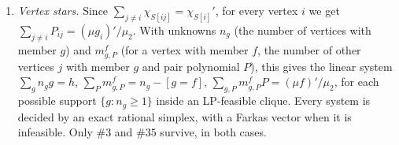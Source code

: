 \documentclass[11pt]{article}
\theoremstyle{definition}
\begin{document}
\begin{enumerate}
$(S^k)_{ij}\equiv k\pmod2$, by $S^k\equiv I+kJ$; (J2) $\mathrm{Sim}\mid g_ig_j-\psi_{ij}^2$; (J3)
$\psi_{ij}(\lambda)^2\le g_i(\lambda)g_j(\lambda)$ at the multiple eigenvalues (Cauchy--Schwarz for
$E_\lambda\succeq0$); (J4) $\chi_{S[ij]}$ is real-rooted and interlaces $\chi_{S[i]}$ and
$\chi_{S[j]}$; (J5) $\chi_{S[ij]}$ has the trace, the trace of the square and the $2$-adic form
\cite[Thm.~2.5]{GSY21} of a Seidel matrix of order $n-2$. Every $\psi_{ij}$ allowed by (J1)--(J5) is
enumerated. The graph ``some pair polynomial exists'' and its cliques exclude $\#20$.
\item \emph{Vertex stars.} Since $\sum_{j\ne i}\chi_{S[ij]}=\chi_{S[i]}'$, for every vertex $i$ we get
$\sum_{j\ne i}P_{ij}=(\mu g_i)'/\mu_2$. With unknowns $n_g$ (the number of vertices with member $g$) and
$m^f_{g,P}$ (for a vertex with member $f$, the number of other vertices $j$ with member $g$ and pair
polynomial $P$), this gives the linear system $\sum_gn_gg=h$,
$\sum_Pm^f_{g,P}=n_g-[g=f]$, $\sum_{g,P}m^f_{g,P}P=(\mu f)'/\mu_2$, for each possible support
$\{g:n_g\ge1\}$ inside an LP-feasible clique. Every system is decided by an exact rational simplex,
with a Farkas vector when it is infeasible. Only $\#3$ and $\#35$ survive, in both cases.
\end{enumerate}
\end{document}
